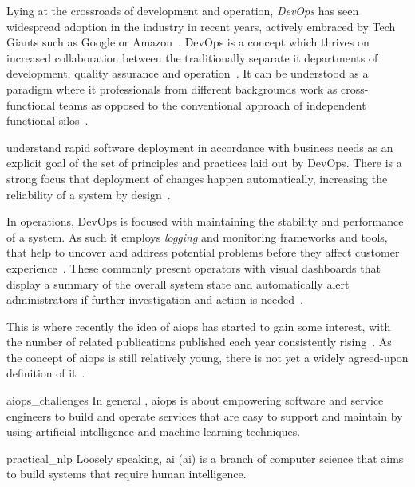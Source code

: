 Lying at the crossroads of development and operation,
\emph{DevOps} has seen widespread adoption in the industry in recent years,
actively embraced by Tech Giants such as Google or Amazon~\parencites[213]{application_lifecycle}[94]{devops}.
DevOps is a concept which thrives on increased collaboration between the traditionally separate \ac{it} departments of development, quality assurance and operation~\parencite[94]{devops}.
It can be understood as a paradigm
where \ac{it} professionals from different backgrounds work as cross-functional teams
as opposed to the conventional approach of independent functional silos~\parencites[94]{devops}[213]{application_lifecycle}.

\citeauthor*{application_lifecycle} understand rapid software deployment in accordance with business needs
as an explicit goal of the set of principles and practices laid out by DevOps.
There is a strong focus that deployment of changes happen automatically,
increasing the reliability of a system by design~\parencite[213]{application_lifecycle}.

In operations, DevOps is focused with maintaining the stability and performance of a system.
As such it employs \emph{logging} and monitoring frameworks and tools,
that help to uncover and address potential problems before they affect customer experience~\parencite[97-98]{devops}.
These commonly present operators with visual dashboards that display a summary of the overall system state
and automatically alert administrators if further investigation and action is needed~\parencite{devops}.

This is where recently the idea of \ac{aiops} has started to gain some interest,
with the number of related publications published each year consistently rising~\parencites[38-39]{aiops_literature_review}[119]{aiops_trends}.
As the concept of \ac{aiops} is still relatively young,
there is not yet a widely agreed-upon definition of it~\parencites[40-41]{aiops_literature_review}[4]{aiops_challenges}.
\begin{displaycquote}[4]{aiops_challenges}
In general , \acs{aiops} is about empowering software and service engineers
to \textelp{} build and operate services that are easy to support and maintain
by using artificial intelligence and machine learning techniques.
\end{displaycquote}
\begin{displaycquote}[14]{practical_nlp}
Loosely speaking, \acl{ai} (\acs{ai}) is a branch of computer science
that aims to build systems that require human intelligence.
\end{displaycquote}

